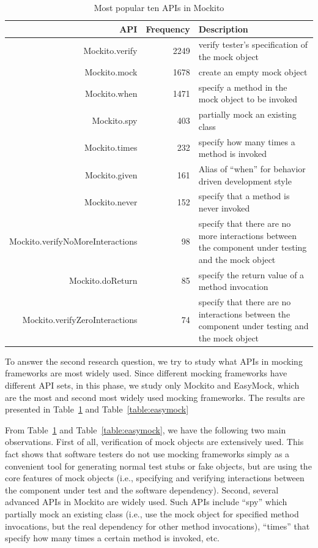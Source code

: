 \begin{table}
\caption{Most popular ten APIs in Mockito}
\small
\label{table:mockito}
\centering
\begin{tabular}{|r|r|p{2.6in}|}
\hline
API & Frequency & Description\\
\hline
Mockito.verify&2249 & verify tester's specification of the mock object\\
Mockito.mock&1678 & create an empty mock object\\
Mockito.when&1471 & specify a method in the mock object to be invoked\\
Mockito.spy&403      & partially mock an existing class\\
Mockito.times&232   & specify how many times a method is invoked\\
Mockito.given&161   & Alias of ``when'' for behavior driven development style\\
Mockito.never&152  & specify that a method is never invoked\\
Mockito.verifyNoMoreInteractions & 98 & specify that there are no more interactions between the component under testing and the mock object\\ 
Mockito.doReturn & 85 & specify the return value of a method invocation\\
Mockito.verifyZeroInteractions & 74 & specify that there are no interactions between the component under testing and the mock object\\ 
\hline
\end{tabular}

\end{table}



To answer the second research question, we try to study what APIs in mocking frameworks are most widely used. Since different mocking frameworks have different API sets, in this phase, we study only Mockito and EasyMock, which are the most and second most widely used mocking frameworks. The results are presented in Table~\ref{table:mockito} and Table~\ref{table:easymock}


From Table~\ref{table:mockito} and Table~\ref{table:easymock}, we have the following two main observations. First of all, verification of mock objects are extensively used. This fact shows that software testers do not use mocking frameworks simply as a convenient tool for generating normal test stubs or fake objects, but are using the core features of mock objects (i.e., specifying and verifying interactions between the component under test and the software dependency). Second, several advanced APIs in Mockito are widely used. Such APIs include ``spy'' which partially mock an existing class (i.e., use the mock object for specified method invocations, but the real dependency for other method invocations), ``times'' that specify how many times a certain method is invoked, etc. 

